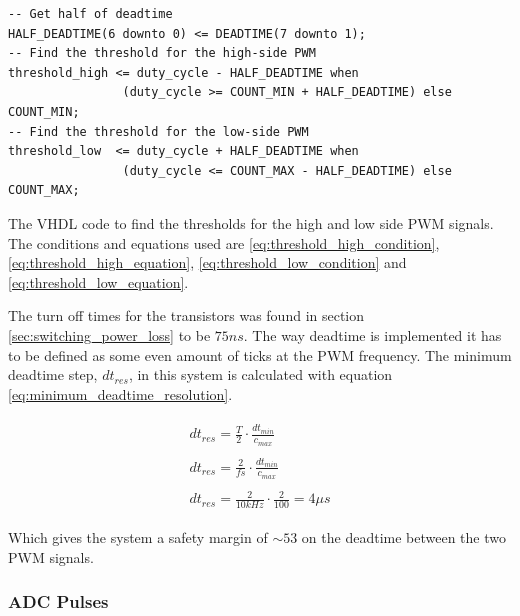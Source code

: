 \begin{verbatim}
-- Get half of deadtime
HALF_DEADTIME(6 downto 0) <= DEADTIME(7 downto 1);
-- Find the threshold for the high-side PWM
threshold_high <= duty_cycle - HALF_DEADTIME when 
                (duty_cycle >= COUNT_MIN + HALF_DEADTIME) else COUNT_MIN;
-- Find the threshold for the low-side PWM
threshold_low  <= duty_cycle + HALF_DEADTIME when 
                (duty_cycle <= COUNT_MAX - HALF_DEADTIME) else COUNT_MAX;
\end{verbatim}
\begin{center}
    The VHDL code to find the thresholds for the high and low side PWM signals. The conditions and equations used are \ref{eq:threshold_high_condition}, \ref{eq:threshold_high_equation}, \ref{eq:threshold_low_condition} and \ref{eq:threshold_low_equation}.
\end{center}



The turn off times for the transistors was found in section \ref{sec:switching_power_loss} to be $75ns$.
The way deadtime is implemented it has to be defined as some even amount of ticks at the PWM frequency.
The minimum deadtime step, $dt_{res}$, in this system is calculated with equation \ref{eq:minimum_deadtime_resolution}.

\begin{subequations}
    \begin{align}
        \begin{split}
            dt_{res} = \frac{T}{2} \cdot \frac{dt_{min}}{c_{max}}
        \end{split} \\ 
        \begin{split}
             dt_{res} = \frac{2}{fs} \cdot \frac{dt_{min}}{c_{max}}
        \end{split} \\ 
        \begin{split}
             dt_{res} = \frac{2}{10kHz} \cdot \frac{2}{100} = 4\mu s
        \end{split} 
    \end{align}
    \label{eq:minimum_deadtime_resolution}
\end{subequations}

Which gives the system a safety margin of $\sim 53$ on the deadtime between the two PWM signals.


\subsubsection*{ADC Pulses}

